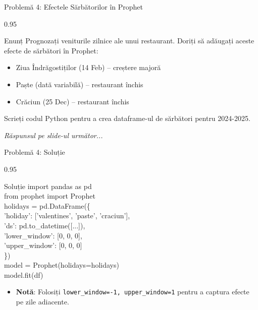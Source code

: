 \documentclass[9pt, aspectratio=169, t]{beamer}
\begin{document}
\begin{frame}{Problemă 4: Efectele Sărbătorilor în Prophet}
    \begin{cminipage}{0.95\textwidth}
    \begin{block}{Enunț}
        Prognozați veniturile zilnice ale unui restaurant. Doriți să adăugați aceste efecte de sărbători în Prophet:
        \begin{itemize}\setlength{\itemsep}{0pt}
            \item Ziua Îndrăgostiților (14 Feb) -- creștere majoră
            \item Paște (dată variabilă) -- restaurant închis
            \item Crăciun (25 Dec) -- restaurant închis
        \end{itemize}

        Scrieți codul Python pentru a crea dataframe-ul de sărbători pentru 2024-2025.
    \end{block}

    \vspace{0.5cm}
    \begin{flushright}\textit{Răspunsul pe slide-ul următor...}\end{flushright}
    \end{cminipage}
\end{frame}

\begin{frame}{Problemă 4: Soluție}
    \begin{cminipage}{0.95\textwidth}
    \begin{exampleblock}{Soluție}
        {\scriptsize\ttfamily
        import pandas as pd\\
        from prophet import Prophet\\[0.2em]
        holidays = pd.DataFrame(\{\\
        \quad 'holiday': ['valentines', 'paste', 'craciun'],\\
        \quad 'ds': pd.to\_datetime([...]),\\
        \quad 'lower\_window': [0, 0, 0],\\
        \quad 'upper\_window': [0, 0, 0]\\
        \})\\[0.2em]
        model = Prophet(holidays=holidays)\\
        model.fit(df)
        }
        \vspace{0.2cm}
        \begin{itemize}\setlength{\itemsep}{0pt}
            \item \textbf{Notă}: Folosiți \texttt{lower\_window=-1, upper\_window=1} pentru a captura efecte pe zile adiacente.
        \end{itemize}
    \end{exampleblock}
    \end{cminipage}
\end{frame}
\end{document}

